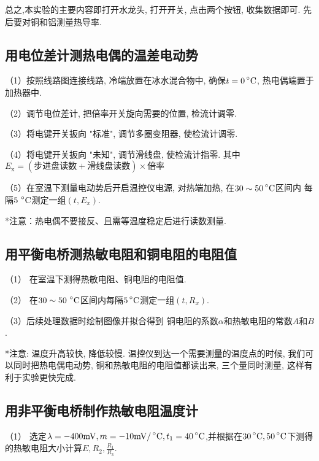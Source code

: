 \documentclass[11pt]{article}
\begin{document}
总之,本实验的主要内容即打开水龙头, 打开开关, 点击两个按钮, 收集数据即可. 先后要对铜和铝测量热导率.


\subsection{用电位差计测热电偶的温差电动势}


    
    （1）按照线路图连接线路, 冷端放置在冰水混合物中, 确保$t=0 \mathop{}\!\mathrm{\prescript{\circ}{}C}$,
    热电偶端置于加热器中. 
    
    （2）调节电位差计, 把倍率开关旋向需要的位置, 检流计调零.
    
    （3）将电键开关扳向 "标准", 调节多圈变阻器, 使检流计调零.
    
    （4）将电键开关扳向 "未知", 调节滑线盘, 使检流计指零. 其中
   $
        E_{\mathrm{x}} = (\text{步进盘读数}+\text{滑线盘读数})\times\text{倍率}
    $
    
    （5）在室温下测量电动势后开启温控仪电源, 对热端加热, 在$ 30\sim 50\mathop{}\!\mathrm{\prescript{\circ}{}C} $区间内
    每隔$5\,\mathop{}\!\mathrm{\prescript{\circ}{}C} $测定一组$ (t,E_x)$.  

*注意：热电偶不要接反、且需等温度稳定后进行读数测量.


\subsection{用平衡电桥测热敏电阻和铜电阻的电阻值}


    
    （1） 在室温下测得热敏电阻、铜电阻的电阻值. 

    （2） 在$ 30\sim 50\,\mathop{}\!\mathrm{\prescript{\circ}{}C} $区间内每隔$ 5\mathop{}\!\mathrm{\prescript{\circ}{}C} $测定一组$ (t,R_x) $. 

    （3）后续处理数据时绘制图像并拟合得到
    铜电阻的系数$\alpha$和热敏电阻的常数$A$和$B$. 



*注意: 温度升高较快, 降低较慢. 温控仪到达一个需要测量的温度点的时候, 
我们可以同时把热电偶电动势, 铜和热敏电阻的电阻值都读出来, 
三个量同时测量, 这样有利于实验更快完成.

\subsection{用非平衡电桥制作热敏电阻温度计}


    
    （1） 选定$\lambda = -400\mathrm{mV}, m=-10\mathrm{mV/\mathop{}\!\mathrm{\prescript{\circ}{}C}}, t_1=40\mathop{}\!\mathrm{\prescript{\circ}{}C} $,并根据在$ 30\mathop{}\!\mathrm{\prescript{\circ}{}C},50\mathop{}\!\mathrm{\prescript{\circ}{}C} $下测得的热敏电阻大小计算$ E,R_2,\frac{R_1}{R_3} $.
\end{document}
